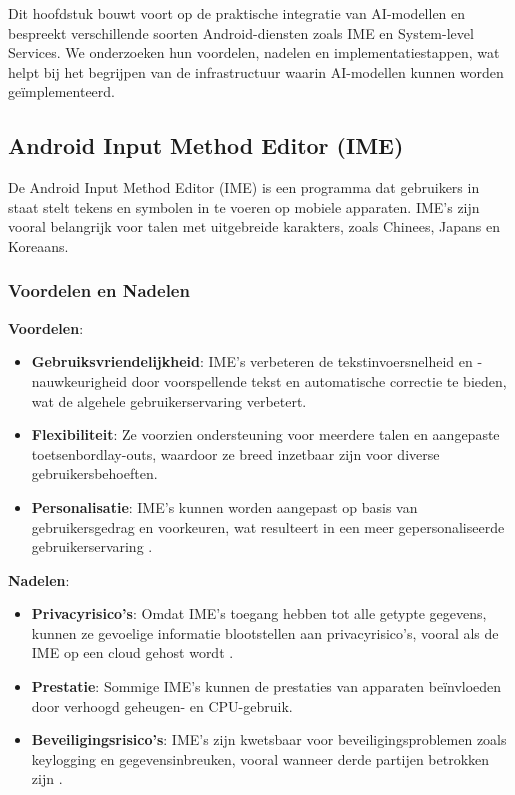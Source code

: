 Dit hoofdstuk bouwt voort op de praktische integratie van AI-modellen en bespreekt verschillende soorten Android-diensten zoals IME en System-level Services. We onderzoeken hun voordelen, nadelen en implementatiestappen, wat helpt bij het begrijpen van de infrastructuur waarin AI-modellen kunnen worden geïmplementeerd.


\subsection{Android Input Method Editor (IME)}

De Android Input Method Editor (IME) is een programma dat gebruikers in staat stelt tekens en symbolen in te voeren op mobiele apparaten. IME's zijn vooral belangrijk voor talen met uitgebreide karakters, zoals Chinees, Japans en Koreaans.

\subsubsection{Voordelen en Nadelen}

\textbf{Voordelen}:
\begin{itemize}
    \item \textbf{Gebruiksvriendelijkheid}: IME's verbeteren de tekstinvoersnelheid en -nauw\-keu\-rig\-heid door voorspellende tekst en automatische correctie te bieden, wat de algehele gebruikerservaring verbetert.
    \item \textbf{Flexibiliteit}: Ze voorzien ondersteuning voor meerdere talen en aangepaste toetsenbordlay-outs, waardoor ze breed inzetbaar zijn voor diverse gebruikersbehoeften.
    \item \textbf{Personalisatie}: IME's kunnen worden aangepast op basis van gebruikersgedrag en voorkeuren, wat resulteert in een meer gepersonaliseerde gebruikerservaring \autocite{Jo2015}.
\end{itemize}

\textbf{Nadelen}:
\begin{itemize}
    \item \textbf{Privacyrisico's}: Omdat IME's toegang hebben tot alle getypte gegevens, kunnen ze gevoelige informatie blootstellen aan privacyrisico's, vooral als de IME op een cloud gehost wordt \autocite{Kawamoto2014}.
    \item \textbf{Prestatie}: Sommige IME's kunnen de prestaties van apparaten beïnvloeden door verhoogd geheugen- en CPU-gebruik.
    \item \textbf{Beveiligingsrisico's}: IME's zijn kwetsbaar voor beveiligingsproblemen zoals keylogging en gegevensinbreuken, vooral wanneer derde partijen betrokken zijn \autocite{Diao2015}.
\end{itemize}

